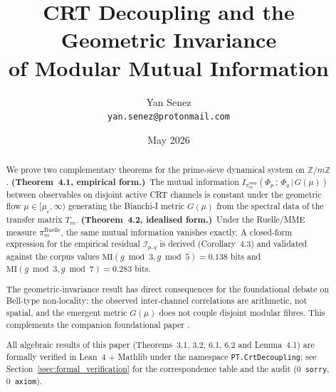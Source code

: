 \documentclass[12pt,a4paper]{article}
\title{\textbf{CRT Decoupling and the Geometric Invariance\\
of Modular Mutual Information}}
\author{Yan Senez\\
\texttt{yan.senez@protonmail.com}}
\date{May 2026}
\begin{document}
\maketitle

\begin{abstract}
We prove two complementary theorems for the prime-sieve dynamical
system on $\mathbb{Z}/m\mathbb{Z}$.
\textbf{(Theorem~4.1, empirical form.)}~The mutual information
$I_{\pi_m^{\mathrm{emp}}}(\Phi_p\,;\,\Phi_q\,|\,G(\mu))$ between
observables on disjoint active CRT channels is constant under the
geometric flow $\mu \in [\mu_c, \infty)$ generating the Bianchi-I
metric $G(\mu)$ from the spectral data of the transfer matrix
$T_m$.
\textbf{(Theorem~4.2, idealised form.)}~Under the Ruelle/MME
measure $\pi_m^{\mathrm{Ruelle}}$, the same mutual information
vanishes exactly.
A closed-form expression for the empirical residual
$\mathcal{I}_{p,q}$ is derived (Corollary~4.3) and validated
against the corpus values $\mathrm{MI}(g\bmod 3, g\bmod 5) = 0.138$
bits and $\mathrm{MI}(g\bmod 3, g\bmod 7) = 0.283$ bits.

The geometric-invariance result has direct consequences for the
foundational debate on Bell-type non-locality: the observed
inter-channel correlations are arithmetic, not spatial, and the
emergent metric $G(\mu)$ does not couple disjoint modular fibres.
This complements the companion foundational paper
\cite{PT_HOLONOMY_NONLOCALITY}.

All algebraic results of this paper (Theorems~3.1, 3.2, 6.1, 6.2 and
Lemma~4.1) are formally verified in Lean~4 + Mathlib under the
namespace \texttt{PT.CrtDecoupling}; see
Section~\ref{ssec:formal_verification} for the correspondence table
and the audit (0~\texttt{sorry}, 0~\texttt{axiom}).
\end{abstract}

\tableofcontents










\appendix





\end{document}
